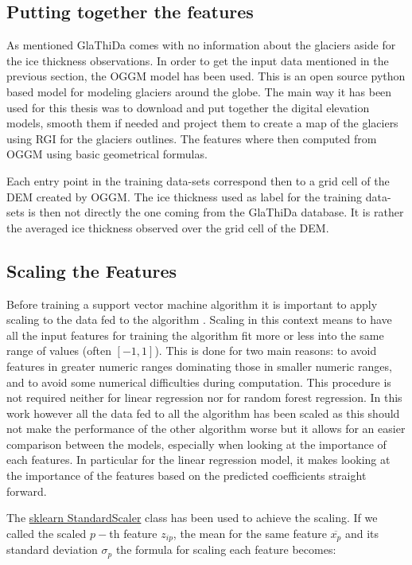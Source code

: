 \subsection{Putting together the features}
As mentioned GlaThiDa comes with no information about the glaciers aside for the ice thickness observations. In order to get the input data mentioned in the previous section, the OGGM model has been used. This is an open source python based model for modeling glaciers around the globe. The main way it has been used for this thesis was to download and put together the digital elevation models, smooth them if needed and project them to create a map of the glaciers using RGI for the glaciers outlines. The features where then computed from OGGM using basic geometrical formulas. 

Each entry point in the training data-sets correspond then to a grid cell of the DEM created by OGGM. The ice thickness used as label for the training data-sets is then not directly the one coming from the GlaThiDa database. It is rather the averaged ice thickness observed over the grid cell of the DEM.

\subsection{Scaling the Features}
Before training a support vector machine algorithm it is important to apply scaling to the data fed to the algorithm \citet{ScalingSVM2003}. Scaling in this context means to have all the input features for training the algorithm fit more or less into the same range of values (often $[-1,1]$). This is done for two main reasons: to avoid features in greater numeric ranges dominating those in smaller numeric ranges, and to avoid some numerical difficulties during computation. This procedure is not required neither for linear regression nor for random forest regression. In this work however all the data fed to all the algorithm has been scaled as this should not make the performance of the other algorithm worse but it allows for an easier comparison between the models, especially when looking at the importance of each features. In particular for the linear regression model, it makes looking at the importance of the features based on the predicted coefficients straight forward.

The \href{https://scikit-learn.org/stable/modules/generated/sklearn.preprocessing.StandardScaler.html}{sklearn StandardScaler} class has been used to achieve the scaling. If we called the scaled $p-$th feature $z_{ip}$, the mean for the same feature $\overline{x_p}$ and its standard deviation $\sigma_p$ the formula for scaling each feature becomes:

